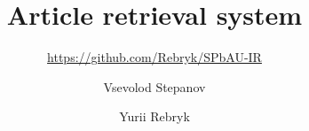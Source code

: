 \documentclass[sigconf]{acmart}
\begin{document}
\title{Article retrieval system}
\subtitle{\url{https://github.com/Rebryk/SPbAU-IR}}


\author{Vsevolod Stepanov}

\author{Yurii Rebryk}

\maketitle




 
\end{document}
